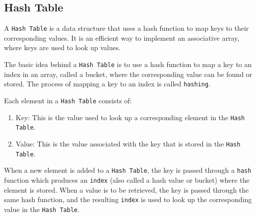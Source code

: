 \subsection{Hash Table}


A \lstinline{Hash Table} is a data structure that uses a hash function to map keys to their corresponding values. It is an efficient way to implement an associative array, where keys are used to look up values.
\smallskip

The basic idea behind a \lstinline{Hash Table} is to use a hash function to map a key to an index in an array, called a bucket, where the corresponding value can be found or stored. The process of mapping a key to an index is called \lstinline{hashing}.
\smallskip

Each element in a \lstinline{Hash Table} consists of:
\begin{enumerate}
    \item Key: This is the value used to look up a corresponding element in the \lstinline{Hash Table}.
    \item Value: This is the value associated with the key that is stored in the \lstinline{Hash Table}.
\end{enumerate}

When a new element is added to a \lstinline{Hash Table}, the key is passed through a \lstinline{hash} function which produces an \lstinline{index} (also called a hash value or bucket) where the element is stored.
When a value is to be retrieved, the key is passed through the same hash function, and the resulting \lstinline{index} is used to look up the corresponding value in the \lstinline{Hash Table}.

